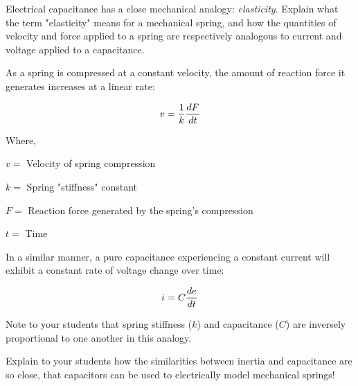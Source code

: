 

Electrical capacitance has a close mechanical analogy: {\it elasticity}.  Explain what the term "elasticity" means for a mechanical spring, and how the quantities of velocity and force applied to a spring are respectively analogous to current and voltage applied to a capacitance.







As a spring is compressed at a constant velocity, the amount of reaction force it generates increases at a linear rate:

$$v = {1 \over k}{dF \over dt}$$

\noindent
Where,

$v = $ Velocity of spring compression

$k = $ Spring "stiffness" constant

$F = $ Reaction force generated by the spring's compression

$t = $ Time

\vskip 10pt

In a similar manner, a pure capacitance experiencing a constant current will exhibit a constant rate of voltage change over time:

$$i = C{de \over dt}$$







Note to your students that spring stiffness ($k$) and capacitance ($C$) are inversely proportional to one another in this analogy.

Explain to your students how the similarities between inertia and capacitance are so close, that capacitors can be used to electrically model mechanical springs!




